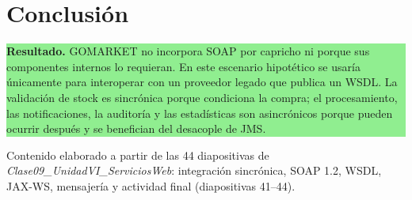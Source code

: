 \documentclass[11pt,a4paper]{article}
\newcommand{\resultbox}[1]{%
  \noindent\colorbox{lightgreen}{\parbox{0.96\linewidth}{%
    \textbf{\color{green}Resultado.} #1}}
}
\begin{document}
\section{Conclusión}

\resultbox{GOMARKET no incorpora SOAP por capricho ni porque sus componentes
internos lo requieran. En este escenario hipotético se usaría únicamente para
interoperar con un proveedor legado que publica un WSDL. La validación de stock
es sincrónica porque condiciona la compra; el procesamiento, las notificaciones,
la auditoría y las estadísticas son asincrónicos porque pueden ocurrir después y
se benefician del desacople de JMS.}

\vfill
{\small\color{graytext}
Contenido elaborado a partir de las 44 diapositivas de
\emph{Clase09\_UnidadVI\_ServiciosWeb}: integración sincrónica, SOAP 1.2, WSDL,
JAX-WS, mensajería y actividad final (diapositivas 41--44).}
\end{document}
